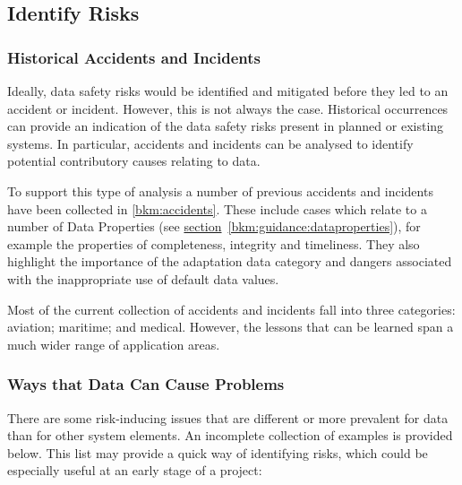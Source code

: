 \subsection{Identify Risks}
\subsubsection{Historical Accidents and Incidents}
Ideally, data safety risks would be identified and mitigated before they led to an accident or incident. However, this is not always the case. Historical occurrences can provide an indication of the data safety risks present in planned or existing systems. In particular, accidents and incidents can be analysed to identify potential contributory causes relating to data.

To support this type of analysis a number of previous accidents and incidents have been collected in \autoref{bkm:accidents}.
These include cases which relate to a number of Data Properties (see
\hyperref[bkm:guidance:dataproperties]{section}~\ref{bkm:guidance:dataproperties}), %
for example the properties of \gls{completeness}, integrity and timeliness.
They also highlight the importance of the \gls{adaptation data} category and dangers associated with the inappropriate use of default data values.

Most of the current collection of accidents and incidents fall into three categories: aviation; maritime; and medical. However, the lessons that can be learned span a much wider range of application areas.

\subsubsection{Ways that Data Can Cause Problems}
\label{tab:issues}
There are some risk-inducing issues that are different or more prevalent for data than for other system elements. An incomplete collection of examples is provided below. This list may provide a quick way of identifying risks, which could be especially useful at an early stage of a project:

